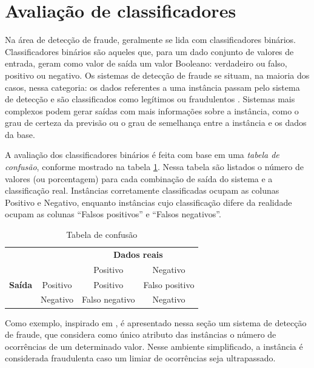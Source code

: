 \section{Avaliação de classificadores}

Na área de detecção de fraude, geralmente se lida com classificadores binários. Classificadores binários são aqueles que, para um dado conjunto de valores de entrada, geram como valor de saída um valor Booleano: verdadeiro ou falso, positivo ou negativo. Os sistemas de detecção de fraude se situam, na maioria dos casos, nessa categoria: os dados referentes a uma instância passam pelo sistema de detecção e são classificados como legítimos ou fraudulentos \cite{Bewick2004}. Sistemas mais complexos podem gerar saídas com mais informações sobre a instância, como o grau de certeza da previsão ou o grau de semelhança entre a instância e os dados da base.

A avaliação dos classificadores binários é feita com base em uma \emph{tabela de confusão}, conforme mostrado na tabela \ref{fraud:confusion}. Nessa tabela são listados o número de valores (ou porcentagem) para cada combinação de saída do sistema e a classificação real. Instâncias corretamente classificadas ocupam as colunas Positivo e Negativo, enquanto instâncias cujo classificação difere da realidade ocupam as colunas ``Falsos positivos'' e ``Falsos negativos''.

\vspace{0.5cm}
\renewcommand{\arraystretch}{1.5}
\begin{table}[h!]
    \centering
    \caption{Tabela de confusão}
    \label{fraud:confusion}
    \vspace{0.5cm}
    \begin{tabular}{c l c c}
        & & \multicolumn{2}{c}{\textbf{Dados reais}} \\
        \multirow{3}{5mm}{\begin{sideways}\parbox{20mm}{\textbf{Saída}}\end{sideways}} & \multicolumn{1}{c|}{} & Positivo & Negativo \\
        \cline{2-4}
        & \multicolumn{1}{c|}{Positivo} & Positivo & Falso positivo\\
        & \multicolumn{1}{c|}{Negativo} & Falso negativo & Negativo\\
    \end{tabular}
\end{table}
\vspace{0.5cm}

Como exemplo, inspirado em \citet{Bewick2004}, é apresentado nessa seção um sistema de detecção de fraude, que considera como único atributo das instâncias o número de ocorrências de um determinado valor. Nesse ambiente simplificado, a instância é considerada fraudulenta caso um limiar de ocorrências seja ultrapassado.

